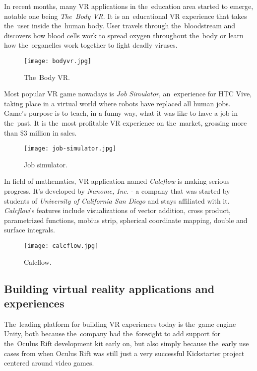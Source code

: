 \newpage

In recent months, many VR applications in the~education area started to emerge, notable one being \textsl{The~Body VR}. It is an~educational VR experience that takes the~user inside the~human body. User travels through the~bloodstream and discovers how blood cells work to spread oxygen throughout the~body or learn how the~organelles work together to fight deadly viruses.

\begin{figure}[ht!]
\centering
\texttt{[image: bodyvr.jpg]}
\caption{The~Body VR. \cite{the-body-vr-pic}}
\label{r:22}
\end{figure}

Most popular VR game nowadays is \textsl{Job Simulator}, an~experience for HTC Vive, taking place in a virtual world where robots have replaced all human jobs. Game's purpose is to teach, in a funny way, what it was like to have a job in the~past. It is the~most profitable VR experience on the~market, grossing more than \$3 million in sales. \cite{thesixthaxis.com}

\begin{figure}[ht!]
\centering
\texttt{[image: job-simulator.jpg]}
\caption{Job simulator. \cite{job-simulator-pic}}
\label{r:23}
\end{figure}

In field of mathematics, VR application named \textsl{Calcflow} is making serious progress. It's developed by \textsl{Nanome, Inc.} - a company that was started by students of \textsl{University of California San Diego} and stays affiliated with it. \textsl{Calcflow}'s features include visualizations of vector addition, cross product, parametrized functions, mobius strip, spherical coordinate mapping, double and surface integrals.

\begin{figure}[ht!]
\centering
\texttt{[image: calcflow.jpg]}
\caption{Calcflow. \cite{calcflow-pic}}
\label{r:24}
\end{figure}

\subsection{Building virtual reality applications and experiences}
The~leading platform for building VR experiences today is the~game engine Unity, both because the~company had the~foresight to add support for the~Oculus Rift development kit early on, but also simply because the~early use cases from when Oculus Rift was still just a very successful Kickstarter project centered around video games.

